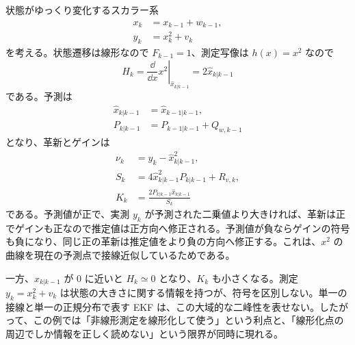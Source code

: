\begin{example}[二乗測定をもつスカラー系]
状態がゆっくり変化するスカラー系
\begin{align}
  x_k&=x_{k-1}+w_{k-1},\\
  y_k&=x_k^2+v_k
\end{align}
を考える。状態遷移は線形なので $F_{k-1}=1$、測定写像は $h(x)=x^2$ なので
\begin{equation}
  H_k=\left.\frac{\dd}{\dd x}x^2\right|_{\hat{x}_{k|k-1}}
  =2\hat{x}_{k|k-1}
\end{equation}
である。予測は
\begin{align}
  \hat{x}_{k|k-1}&=\hat{x}_{k-1|k-1},\\
  P_{k|k-1}&=P_{k-1|k-1}+Q_{w,k-1}
\end{align}
となり、革新とゲインは
\begin{align}
  \nu_k&=y_k-\hat{x}_{k|k-1}^2,\\
  S_k&=4\hat{x}_{k|k-1}^2P_{k|k-1}+R_{v,k},\\
  K_k&=\frac{2P_{k|k-1}\hat{x}_{k|k-1}}{S_k}
\end{align}
である。予測値が正で、実測 $y_k$ が予測された二乗値より大きければ、革新は正でゲインも正なので推定値は正方向へ修正される。予測値が負ならゲインの符号も負になり、同じ正の革新は推定値をより負の方向へ修正する。これは、$x^2$ の曲線を現在の予測点で接線近似しているためである。

一方、$\hat{x}_{k|k-1}$ が 0 に近いと $H_k\simeq0$ となり、$K_k$ も小さくなる。測定 $y_k=x_k^2+v_k$ は状態の大きさに関する情報を持つが、符号を区別しない。単一の接線と単一の正規分布で表す EKF は、この大域的な二峰性を表せない。したがって、この例では「非線形測定を線形化して使う」という利点と、「線形化点の周辺でしか情報を正しく読めない」という限界が同時に現れる。
\end{example}

